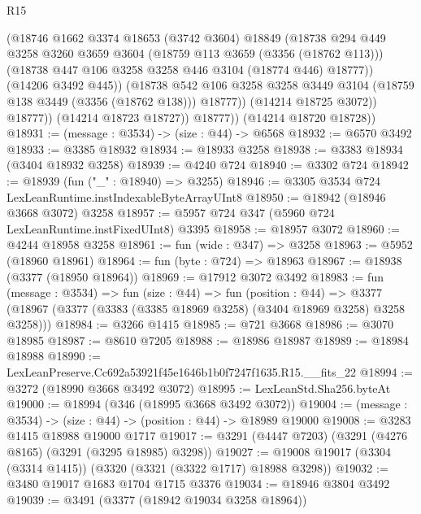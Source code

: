 \begin{lexlean}{R15}
\begin{coremodule}
                    (@18746
                      @1662
                      @3374
                      @18653
                      (@3742 @3604)
                      @18849
                      (@18738
                        @294
                        @449
                        @3258
                        @3260
                        @3659
                        @3604
                        (@18759 @113 @3659 (@3356 (@18762 @113)))
                        (@18738 @447 @106 @3258 @3258 @446 @3104 (@18774 @446) @18777))
                      (@14206 @3492 @445))
                    (@18738
                      @542
                      @106
                      @3258
                      @3258
                      @3449
                      @3104
                      (@18759 @138 @3449 (@3356 (@18762 @138)))
                      @18777))
                  (@14214 @18725 @3072))
                @18777))
            (@14214 @18723 @18727))
          @18777))
      (@14214 @18720 @18728))
@18931 := (message : @3534) -> (size : @44) -> @6568
@18932 := @6570 @3492
@18933 := @3385 @18932
@18934 := @18933 @3258
@18938 := @3383 @18934 (@3404 @18932 @3258)
@18939 := @4240 @724
@18940 := @3302 @724
@18942 := @18939 (fun ("_" : @18940) => @3255)
@18946 := @3305 @3534 @724 LexLeanRuntime.instIndexableByteArrayUInt8
@18950 := @18942 (@18946 @3668 @3072) @3258
@18957 := @5957 @724 @347 (@5960 @724 LexLeanRuntime.instFixedUInt8) @3395
@18958 := @18957 @3072
@18960 := @4244 @18958 @3258
@18961 := fun (wide : @347) => @3258
@18963 := @5952 (@18960 @18961)
@18964 := fun (byte : @724) => @18963
@18967 := @18938 (@3377 (@18950 @18964))
@18969 := @17912 @3072 @3492
@18983 := fun (message : @3534) =>
  fun (size : @44) =>
  fun (position : @44) =>
  @3377 (@18967 (@3377 (@3383 (@3385 @18969 @3258) (@3404 @18969 @3258) @3258 @3258)))
@18984 := @3266 @1415
@18985 := @721 @3668
@18986 := @3070 @18985
@18987 := @8610 @7205
@18988 := @18986 @18987
@18989 := @18984 @18988
@18990 := LexLeanPreserve.Cc692a53921f45e1646b1b0f7247f1635.R15.__fits_22
@18994 := @3272 (@18990 @3668 @3492 @3072)
@18995 := LexLeanStd.Sha256.byteAt
@19000 := @18994 (@346 (@18995 @3668 @3492 @3072))
@19004 := (message : @3534) -> (size : @44) -> (position : @44) -> @18989 @19000
@19008 := @3283 @1415 @18988 @19000 @1717
@19017 := @3291 (@4447 @7203) (@3291 (@4276 @8165) (@3291 (@3295 @18985) @3298))
@19027 := @19008 @19017 (@3304 (@3314 @1415)) (@3320 (@3321 (@3322 @1717) @18988 @3298))
@19032 := @3480 @19017 @1683 @1704 @1715 @3376
@19034 := @18946 @3804 @3492
@19039 := @3491 (@3377 (@18942 @19034 @3258 @18964))

\end{coremodule}
\end{lexlean}
